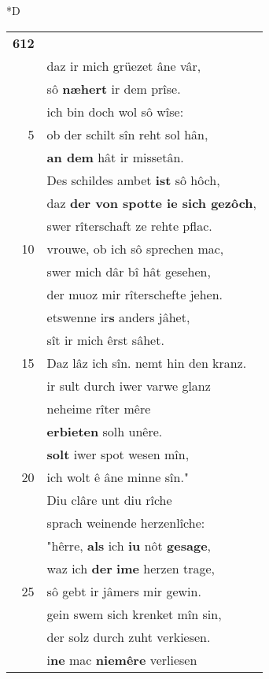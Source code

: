 \documentclass[8pt,a4paper,notitlepage]{article}
\begin{document}
\begin{table}[ht]
\begin{minipage}[t]{0.5\linewidth}
\small
\begin{center}*D
\end{center}
\begin{tabular}{rl}
\textbf{612} & \textit{\begin{large}D\end{large}}ô sprach er: "vrouwe, ist \textbf{daz} wâr,\\ 
 & daz ir mich grüezet âne vâr,\\ 
 & sô \textbf{næhert} ir dem prîse.\\ 
 & ich bin doch wol sô wîse:\\ 
5 & ob der schilt sîn reht sol hân,\\ 
 & \textbf{an dem} hât ir missetân.\\ 
 & Des schildes ambet \textbf{ist} sô hôch,\\ 
 & daz \textbf{der von spotte ie sich gezôch},\\ 
 & swer rîterschaft ze rehte pflac.\\ 
10 & vrouwe, ob ich sô sprechen mac,\\ 
 & swer mich dâr bî hât gesehen,\\ 
 & der muoz mir rîterschefte jehen.\\ 
 & etswenne ir\textbf{s} anders jâhet,\\ 
 & sît ir mich êrst sâhet.\\ 
15 & Daz lâz ich sîn. nemt hin den kranz.\\ 
 & ir sult durch iwer varwe glanz\\ 
 & neheime rîter mêre\\ 
 & \textbf{erbieten} solh unêre.\\ 
 & \textbf{solt} iwer spot wesen mîn,\\ 
20 & ich wolt ê âne minne sîn."\\ 
 & Diu clâre unt diu rîche\\ 
 & sprach weinende herzenlîche:\\ 
 & "hêrre, \textbf{als} ich \textbf{iu} nôt \textbf{gesage},\\ 
 & waz ich \textbf{der} \textbf{ime} herzen trage,\\ 
25 & sô gebt ir jâmers mir gewin.\\ 
 & gein swem sich krenket mîn sin,\\ 
 & der solz durch zuht verkiesen.\\ 
 & i\textbf{ne} mac \textbf{niemêre} verliesen\\ 

\end{tabular}
\end{minipage}
\end{table}
\end{document}

